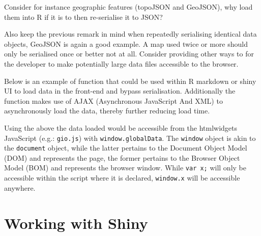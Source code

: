 \documentclass[
]{krantz}
\makeatletter
\newenvironment{Shaded}{\begin{snugshade}}{\end{snugshade}}
\newcommand{\CommentTok}[1]{\textcolor[rgb]{0.37,0.37,0.37}{\textit{#1}}}
\newcommand{\ControlFlowTok}[1]{\textcolor[rgb]{0.27,0.27,0.27}{\textbf{#1}}}
\newcommand{\KeywordTok}[1]{\textcolor[rgb]{0.27,0.27,0.27}{\textbf{#1}}}
\newcommand{\NormalTok}[1]{#1}
\newcommand{\OperatorTok}[1]{\textcolor[rgb]{0.43,0.43,0.43}{\textbf{#1}}}
\newcommand{\StringTok}[1]{\textcolor[rgb]{0.5,0.5,0.5}{#1}}
\newenvironment{kframe}{%
\medskip{}
\setlength{\fboxsep}{.8em}
 \def\at@end@of@kframe{}%
 \ifinner\ifhmode%
  \def\at@end@of@kframe{\end{minipage}}%
  \begin{minipage}{\columnwidth}%
 \fi\fi%
 \def\FrameCommand##1{\hskip\@totalleftmargin \hskip-\fboxsep
 \colorbox{shadecolor}{##1}\hskip-\fboxsep
     \hskip-\linewidth \hskip-\@totalleftmargin \hskip\columnwidth}%
 \MakeFramed {\advance\hsize-\width
   \@totalleftmargin\z@ \linewidth\hsize
   \@setminipage}}%
 {\par\unskip\endMakeFramed%
 \at@end@of@kframe}
\renewenvironment{Shaded}{\begin{kframe}}{\end{kframe}}
\makeatother
\begin{document}
Consider for instance geographic features (topoJSON and GeoJSON), why load them into R if it is to then re-serialise it to JSON?

Also keep the previous remark in mind when repeatedly serialising identical data objects, GeoJSON is again a good example. A map used twice or more should only be serialised once or better not at all. Consider providing other ways to for the developer to make potentially large data files accessible to the browser.

Below is an example of function that could be used within R markdown or shiny UI to load data in the front-end and bypass serialisation. Additionally the function makes use of AJAX (Asynchronous JavaScript And XML) to asynchronously load the data, thereby further reducing load time.

\begin{Shaded}
\end{Shaded}

Using the above the data loaded would be accessible from the htmlwidgets JavaScript (e.g.: \texttt{gio.js}) with \texttt{window.globalData}. The \texttt{window} object is akin to the \texttt{document} object, while the latter pertains to the Document Object Model (DOM) and represents the page, the former pertains to the Browser Object Model (BOM) and represents the browser window. While \texttt{var\ x;} will only be accessible within the script where it is declared, \texttt{window.x} will be accessible anywhere.

\hypertarget{working-with-shiny}{%
\chapter{Working with Shiny}\label{working-with-shiny}}
\end{document}
